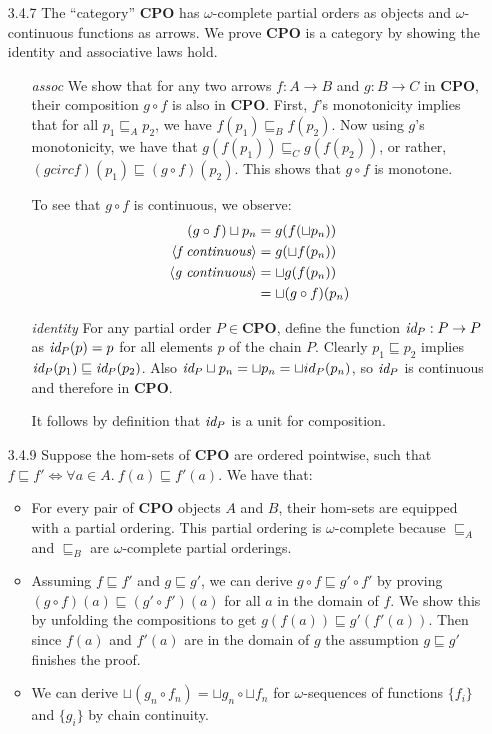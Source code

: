\documentclass{article}
\newcommand{\cpo}{\mathbf{CPO}}
\newcommand{\id}{\emph{id}}
\begin{document}
\begin{enumerate}
\item[3.4.7]
  The ``category'' $\cpo$ has $\omega$-complete partial orders as objects and $\omega$-continuous functions as arrows.
  We prove $\cpo$ is a category by showing the identity and associative laws hold.
  \begin{itemize}
  \item[\emph{assoc}]
    We show that for any two arrows $f : A \rightarrow B$ and $g : B \rightarrow C$ in $\cpo$, their composition $g \circ f$ is also in $\cpo$.
    First, $f$'s monotonicity implies that for all $p_1 \sqsubseteq_A p_2$, we have $f(p_1) \sqsubseteq_B f(p_2)$.
    Now using $g$'s monotonicity, we have that $g(f(p_1)) \sqsubseteq_C g(f(p_2))$, or rather, $(g circ f)(p_1) \sqsubseteq (g \circ f)(p_2)$.
    This shows that $g \circ f$ is monotone.
    
    To see that $g \circ f$ is continuous, we observe:
    \begin{align*}
      (g \circ f) \sqcup p_n &= g(f(\sqcup p_n))
    \\\langle\emph{f continuous}\rangle    &= g(\sqcup f(p_n))
    \\\langle\emph{g continuous}\rangle    &= \sqcup g(f(p_n))
    \\                       &= \sqcup (g \circ f)(p_n)
    \end{align*}

  \item[\emph{identity}]
    For any partial order $P \in \cpo$, define the function $\id_P : P \rightarrow P$ as $\id_P(p) = p$ for all elements $p$ of the chain $P$.
    Clearly $p_1 \sqsubseteq p_2$ implies $\id_P(p_1) \sqsubseteq \id_P(p_2)$.
    Also $\id_P \sqcup p_n = \sqcup p_n = \sqcup id_P(p_n)$, so $\id_P$ is continuous and therefore in $\cpo$.

    It follows by definition that $\id_P$ is a unit for composition.
  \end{itemize}

\item[3.4.9]
  Suppose the hom-sets of $\cpo$ are ordered pointwise, such that $f \sqsubseteq f' \iff \forall a \in A.~f(a) \sqsubseteq f'(a)$.
  We have that:
  \begin{itemize}
  \item
    For every pair of $\cpo$ objects $A$ and $B$, their hom-sets are equipped with a partial ordering.
    This partial ordering is $\omega$-complete because $\sqsubseteq_A$ and $\sqsubseteq_B$ are $\omega$-complete partial orderings.
  \item
    Assuming $f \sqsubseteq f'$ and $g \sqsubseteq g'$, we can derive $g \circ f \sqsubseteq g' \circ f'$ by proving $(g \circ f)(a) \sqsubseteq (g' \circ f')(a)$ for all $a$ in the domain of $f$.
    We show this by unfolding the compositions to get $g(f(a)) \sqsubseteq g'(f'(a))$.
    Then since $f(a)$ and $f'(a)$ are in the domain of $g$ the assumption $g \sqsubseteq g'$ finishes the proof.
  \item
    We can derive $\sqcup(g_n \circ f_n) = \sqcup g_n \circ \sqcup f_n$ for $\omega$-sequences of functions $\{f_i\}$ and $\{g_i\}$ by chain continuity.


\end{itemize}
\end{enumerate}
\end{document}
